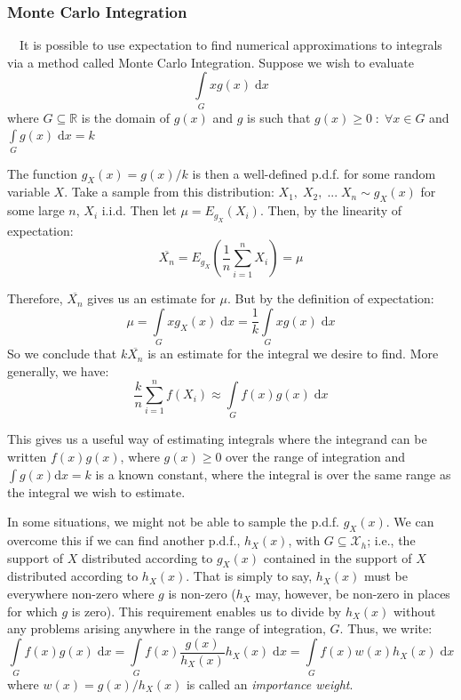 \documentclass[12pt,a4paper]{article}
\begin{document}
\subsubsection{Monte Carlo Integration}

$\quad$It is possible to use expectation to find numerical approximations to integrals via a method called Monte Carlo Integration. Suppose we wish to evaluate
$$\int\limits_{G}\!\!x g(x)\; \mathrm{d}x$$
where $G \subseteq \mathbb{R}$ is the domain of $g(x)$ and $g$ is such that $g(x) \geq 0 \; : \; \forall x \in G$ and $\int\limits_G\!\! g(x)\;\mathrm{d}x = k$

The function $g_X(x) = g(x)/k$ is then a well-defined p.d.f. for some random variable $X$. Take a sample from this distribution: $X_1, \; X_2, \; ... \; X_n \sim g_X(x)$ for some large $n$, $X_i$ i.i.d. Then let $\mu = E_{g_X}(X_i)$. Then, by the linearity of expectation:
$$\overline{X_n} = E_{g_X}(\frac{1}{n}\sum_{i = 1}^n X_i) = \mu$$

\noindent Therefore, $\overline{X_n}$ gives us an estimate for $\mu$. But by the definition of expectation:
$$\mu = \int\limits_G \!\!xg_X(x)\; \mathrm{d}x = \frac{1}{k}\int\limits_G \!\!xg(x)\;\mathrm{d}x$$
So we conclude that $k\overline{X_n}$ is an estimate for the integral we desire to find. More generally, we have:
$$\frac{k}{n} \sum_{i=1}^n f(X_i) \approx \int\limits_G \!\!f(x)g(x)\;\mathrm{d}x$$

This gives us a useful way of estimating integrals where the integrand can be written $f(x)g(x)$, where $g(x) \geq 0$ over the range of integration and $\int g(x)\mathrm{d}x = k$ is a known constant, where the integral is over the same range as the integral we wish to estimate.

In some situations, we might not be able to sample the p.d.f. $g_X(x)$. We can overcome this if we can find another p.d.f., $h_X(x)$, with $G \subseteq \mathcal{X}_h$; i.e., the support of $X$ distributed according to $g_X(x)$ contained in the support of $X$ distributed according to $h_X(x)$. That is simply to say, $h_X(x)$ must be everywhere non-zero where $g$ is non-zero ($h_X$ may, however, be non-zero in places for which $g$ is zero). This requirement enables us to divide by $h_X(x)$ without any problems arising anywhere in the range of integration, $G$. Thus, we write:
$$\int\limits_G \!\!f(x)g(x)\;\mathrm{d}x = \int\limits_G \!\!f(x) \frac{g(x)}{h_X(x)} h_X(x)\; \mathrm{d}x = \int\limits_G\!\! f(x)w(x) h_X(x) \;\mathrm{d}x$$
where $w(x) = g(x)/h_X(x)$ is called an \emph{importance weight}.
\end{document}
